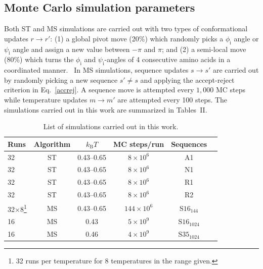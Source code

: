 \documentclass[%
 aip,
rsi,%
 amsmath,amssymb,
 reprint,%
]{revtex4-1}
\newcommand	 {\sbar}	{{s}}
\newcommand	 {\rbar}	{{r}}
\newcommand	 {\kb}		{{k_\mathrm{B}}}
\begin{document}
\subsection{Monte Carlo simulation parameters}
\noindent
Both ST and MS simulations are carried out with two types of conformational updates $\rbar\rightarrow\rbar'$: (1) a global pivot move (20\%) which randomly picks a $\phi_\mathrm{i}$ angle or $\psi_\mathrm{i}$ angle and assign a new value between $-\pi$ and $\pi$; and (2) a semi-local move (80\%) which turns the $\phi_\mathrm{i}$ and $\psi_\mathrm{i}$-angles of 4 consecutive amino acids in a coordinated manner.~\cite{Favrin2001} In MS simulations, sequence updates $\sbar\rightarrow\sbar'$ are carried out by randomly picking a new sequence $\sbar'\ne\sbar$ and applying the accept-reject criterion in Eq.~\ref{accrej}. A sequence move is attempted every $1,000$ MC steps while temperature updates $m\rightarrow m'$ are attempted every 100 steps. The simulations carried out in this work are summarized in Tables~II.

\begin{table}
\caption{\label{tab2} List of simulations carried out in this work. }
\begin{ruledtabular}
\begin{tabular}{lccccr}
Runs & Algorithm & $\kb T$  & MC steps/run &  Sequences\\
\hline
32 & ST & 0.43--0.65 & $8\times 10^6$ &A1\\ 
32 & ST & 0.43--0.65 & $8\times 10^6$ &N1\\ 
32 & ST & 0.43--0.65 & $8\times 10^6$ &R1\\ 
32 & ST & 0.43--0.65 & $8\times 10^6$ &R2\\ 
32$\times$8\footnote{32  runs per temperature for 8 temperatures in the range given.} & MS &0.43--0.65& $144\times 10^6$ & $\mathrm{S16}_{144}$\\
16 & MS & 0.43  & $5\times 10^9$ &  $\mathrm{S16}_{1024}$ \\
16 & MS & 0.46 & $4\times 10^9$ &  $\mathrm{S35}_{1024}$ \\
\end{tabular}
\end{ruledtabular}
\end{table}
\end{document}
